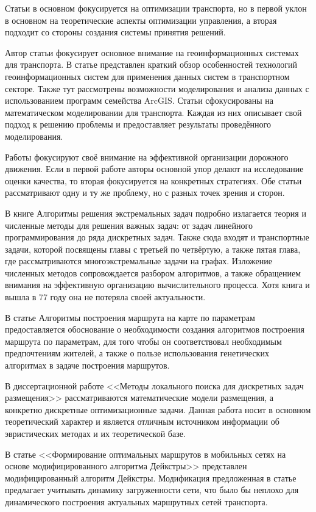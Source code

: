 Статьи \cite{bib:35,bib:36} в основном фокусируется на оптимизации транспорта, но в первой уклон в основном 
на теоретические аспекты оптимизации управления, а вторая подходит со стороны создания системы принятия 
решений.

Автор статьи \cite{bib:33} фокусирует основное внимание на геоинформационных системах для транспорта. 
В статье представлен краткий обзор особенностей технологий геоинформационных систем для применения данных 
систем в транспортном секторе. Также тут рассмотрены возможности моделирования и анализа данных с 
использованием программ семейства ArcGIS. Статьи \cite{bib:37,bib:38,bib:41} сфокусированы на математическом 
моделировании для транспорта. Каждая из них описывает свой подход к решению проблемы и предоставляет 
результаты проведённого моделирования.

Работы \cite{bib:42,bib:43} фокусируют своё внимание на эффективной организации дорожного движения. Если в 
первой работе авторы основной упор делают на исследование оценки качества, то вторая фокусируется на 
конкретных стратегиях. Обе статьи рассматривают одну и ту же проблему, но с разных точек зрения и сторон.

В книге Алгоритмы решения экстремальных задач\cite{bib:56} подробно излагается теория и численные методы 
для решения важных задач: от задач линейного программирования до ряда дискретных задач. Также сюда входят 
и транспортные задачи, которой посвящены главы с третьей по четвёртую, а также пятая глава, где 
рассматриваются многоэкстремальные задачи на графах. Изложение численных методов сопровождается разбором 
алгоритмов, а также обращением внимания на эффективную организацию вычислительного процесса. Хотя книга 
и вышла в 77 году она не потеряла своей актуальности.

В статье Алгоритмы построения маршрута на карте по параметрам\cite{bib:46} предоставляется обоснование 
о необходимости создания алгоритмов построения маршрута по параметрам, для того чтобы он соответствовал 
необходимым предпочтениям жителей, а также о пользе использования генетических алгоритмах в задаче 
построения маршрутов.

В диссертационной работе <<Методы локального поиска для дискретных задач размещения>>\cite{bib:45} 
рассматриваются математические модели размещения, а конкретно дискретные оптимизационные задачи. Данная 
работа носит в основном теоретический характер и является отличным источником информации об эвристических 
методах и их теоретической базе.

В статье <<Формирование оптимальных маршрутов в мобильных сетях на основе модифицированного алгоритма 
Дейкстры>>\cite{bib:55} представлен модифицированный алгоритм Дейкстры. Модификация предложенная в статье 
предлагает учитывать динамику загруженности сети, что было бы неплохо для динамического построения 
актуальных маршрутных сетей транспорта.

